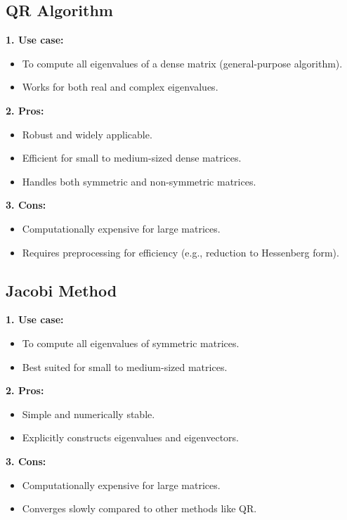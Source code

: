 \documentclass{article}
\begin{document}
\subsection{QR Algorithm}
\textbf{1. Use case:}
\begin{itemize}
    \item To compute all eigenvalues of a dense matrix (general-purpose algorithm).
    \item Works for both real and complex eigenvalues.
\end{itemize}
\textbf{2. Pros:}
\begin{itemize}
    \item Robust and widely applicable.
    \item Efficient for small to medium-sized dense matrices.
    \item Handles both symmetric and non-symmetric matrices.
\end{itemize}
\textbf{3. Cons:}
\begin{itemize}
    \item Computationally expensive for large matrices.
    \item Requires preprocessing for efficiency (e.g., reduction to Hessenberg form).
\end{itemize}
\subsection{Jacobi Method}
\textbf{1. Use case:}
\begin{itemize}
    \item To compute all eigenvalues of symmetric matrices.
    \item Best suited for small to medium-sized matrices.
\end{itemize}
\textbf{2. Pros:}
\begin{itemize}
    \item Simple and numerically stable.
    \item Explicitly constructs eigenvalues and eigenvectors.
    
\end{itemize}
\textbf{3. Cons:}
\begin{itemize}
    \item Computationally expensive for large matrices.
    \item Converges slowly compared to other methods like QR.
\end{itemize}
\end{document}
